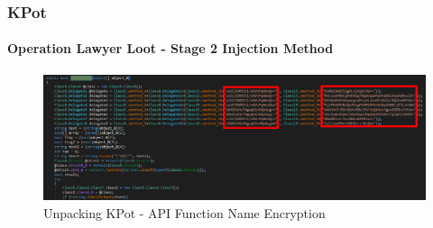 \documentclass[aspectratio=169]{beamer}
\begin{document}
{
\begin{frame}
  \frametitle{KPot}
  \framesubtitle{Operation Lawyer Loot - Stage 2 Injection Method}
  \begin{center}
    \begin{figure}
      \includegraphics[scale=1.28]{kpot-unpacking-8}
      \caption{Unpacking KPot - API Function Name Encryption}
    \end{figure}
  \end{center}
\end{frame}
}
\end{document}
